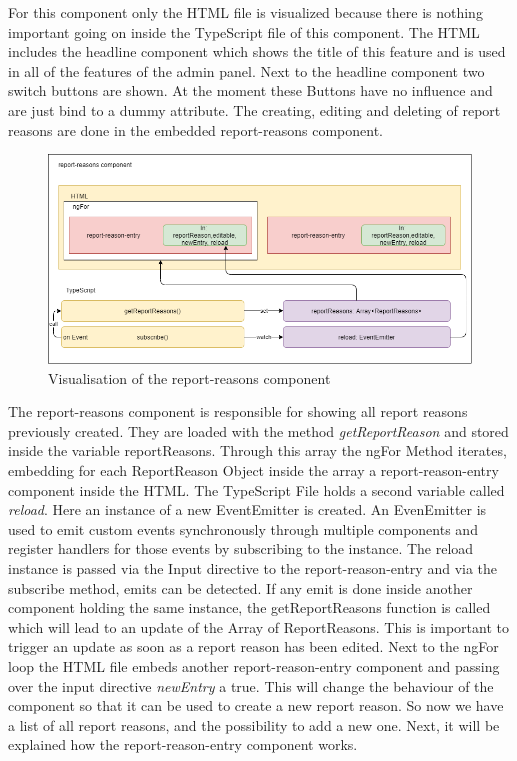 For this component only the HTML file is visualized because there is nothing important going on inside the TypeScript
file of this component.
The HTML includes the headline component which shows the title of this feature and is used in all of the features of
the admin panel.
Next to the headline component two switch buttons are shown.
At the moment these Buttons have no influence and are just bind to a dummy attribute.
The creating, editing and deleting of report reasons are done in the embedded report-reasons component.

\begin{figure}[H]
    \centering
    \includegraphics[width=1.0\textwidth]{./images/report_reasons_2}
    \caption{Visualisation of the report-reasons component}
    \label{fig:reportreason}
\end{figure}
\vspace{5mm}

The report-reasons component is responsible for showing all report reasons previously created.
They are loaded with the method \textit{getReportReason} and stored inside the variable reportReasons.
Through this array the ngFor Method iterates, embedding for each ReportReason Object inside the array a
report-reason-entry component inside the HTML.
The TypeScript File holds a second variable called \textit{reload}.
Here an instance of a new EventEmitter is created.
An EvenEmitter is used to emit custom events synchronously through multiple components and register handlers for
those events by subscribing to the instance.
The reload instance is passed via the Input directive to the report-reason-entry and via the subscribe method,
emits can be detected.
If any emit is done inside another component holding the same instance, the getReportReasons function is called which
will lead to an update of the Array of ReportReasons.
This is important to trigger an update as soon as a report reason has been edited.
Next to the ngFor loop the HTML file embeds another report-reason-entry component and passing over the input
directive \textit{newEntry} a true.
This will change the behaviour of the component so that it can be used to create a new report reason.
So now we have a list of all report reasons, and the possibility to add a new one.
Next, it will be explained how the report-reason-entry component works.

